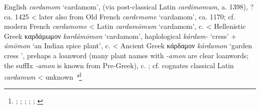 \begin{etymology}\label{ety:cardamom}
English \textit{cardamom} `cardamom', (via post-classical Latin \textit{cardimomum}, a. 1398), ?ca. 1425
< later also from Old French \textit{cardemome} `cardamom', ca. 1170; cf. modern French \textit{cardamome}
< Latin \textit{cardamōmum} `cardamom',  c. \AD{}
< Hellenistic Greek {καρδάμωμον} \textit{kardámōmon} `cardamom', haplological  \textit{kárdam-} `cress' +  \textit{ámōmon} `an Indian spice plant',  c. \BC{}
< Ancient Greek {κάρδαμον} \textit{kárdamon} `garden cress ', prehaps a loanword (many plant names with \textit{-amon} are clear loanwords; the suffIx \textit{-amon} is known from Pre-Greek),  c. \BC{}; cf. cognates classical Latin \textit{cardamum}
< unknown \textit{*}\footnote{\textcite[cardamom]{oed}; \textcite[cardamome]{tlfi}; \textcite[cardamomum]{lewis_latin_1879}; \textcite[καρδάμωμον]{liddell_greek-english_1940}; \textcite[κάρδαμον]{liddell_greek-english_1940}; \textcite[644]{beekes_etymological_2010}}
\end{etymology}